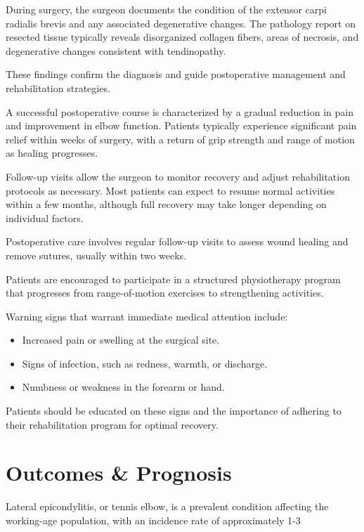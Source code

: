 During surgery, the surgeon documents the condition of the extensor carpi radialis brevis and any associated degenerative changes. The pathology report on resected tissue typically reveals disorganized collagen fibers, areas of necrosis, and degenerative changes consistent with tendinopathy. 

These findings confirm the diagnosis and guide postoperative management and rehabilitation strategies.

A successful postoperative course is characterized by a gradual reduction in pain and improvement in elbow function. Patients typically experience significant pain relief within weeks of surgery, with a return of grip strength and range of motion as healing progresses. 

Follow-up visits allow the surgeon to monitor recovery and adjust rehabilitation protocols as necessary. Most patients can expect to resume normal activities within a few months, although full recovery may take longer depending on individual factors.

Postoperative care involves regular follow-up visits to assess wound healing and remove sutures, usually within two weeks. 

Patients are encouraged to participate in a structured physiotherapy program that progresses from range-of-motion exercises to strengthening activities. 

Warning signs that warrant immediate medical attention include:

\begin{itemize}
  \item Increased pain or swelling at the surgical site.
  \item Signs of infection, such as redness, warmth, or discharge.
  \item Numbness or weakness in the forearm or hand.
\end{itemize}

Patients should be educated on these signs and the importance of adhering to their rehabilitation program for optimal recovery.

\section*{Outcomes \& Prognosis}
Lateral epicondylitis, or tennis elbow, is a prevalent condition affecting the working-age population, with an incidence rate of approximately 1-3%

